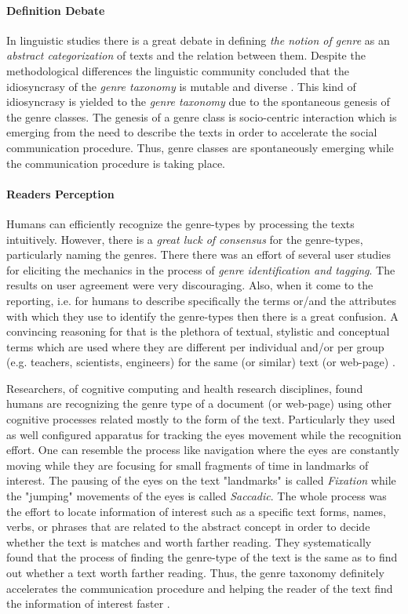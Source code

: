 \paragraph{Definition Debate} In linguistic studies there is a great debate in defining \textit{the notion of genre} as an \textit{abstract categorization} of texts and the relation between them. Despite the methodological differences the linguistic community concluded that the idiosyncrasy of the \textit{genre taxonomy} is mutable and diverse \parencite{coutinho2009describe}. This kind of idiosyncrasy is yielded to the \textit{genre taxonomy} due to the spontaneous genesis of the genre classes. The genesis of a genre class is socio-centric interaction which is emerging from the need to describe the texts in order to accelerate the social communication procedure. Thus, genre classes are spontaneously emerging while the communication procedure is taking place.

\paragraph{Readers Perception} Humans can efficiently recognize the genre-types by processing the texts intuitively. However, there is a \textit{great luck of consensus} for the genre-types, particularly naming the genres. There there was an effort of several user studies for eliciting the mechanics in the process of \textit{genre identification and tagging}. The results on user agreement were very discouraging. Also, when it come to the reporting, i.e. for humans to describe specifically the terms or/and the attributes with which they use to identify the genre-types then there is a great confusion. A convincing reasoning for that is the plethora of textual, stylistic and conceptual terms which are used where they are different per individual and/or per group (e.g. teachers, scientists, engineers) for the same (or similar) text (or web-page) \parencite{roussinov2001genre, crowston2011problems}. 

Researchers, of cognitive computing and health research disciplines, found humans are recognizing the genre type of a document (or web-page) using other cognitive processes related mostly to the form of the text. Particularly they used as well configured apparatus for tracking the eyes movement while the recognition effort. One can resemble the process like navigation where the eyes are constantly moving while they are focusing for small fragments of time in landmarks of interest. The pausing of the eyes on the text "landmarks" is called \textit{Fixation} while the "jumping" movements of the eyes is called \textit{Saccadic}. The whole process was the effort to locate information of interest such as a specific text forms, names, verbs, or phrases that are related to the abstract concept in order to decide whether the text is matches and worth farther reading. They systematically found that the process of finding the genre-type of the text is the same as to find out whether a text worth farther reading. Thus, the genre taxonomy definitely accelerates the communication procedure and helping the reader of the text find the information of interest faster \parencite{clark2014you}.


